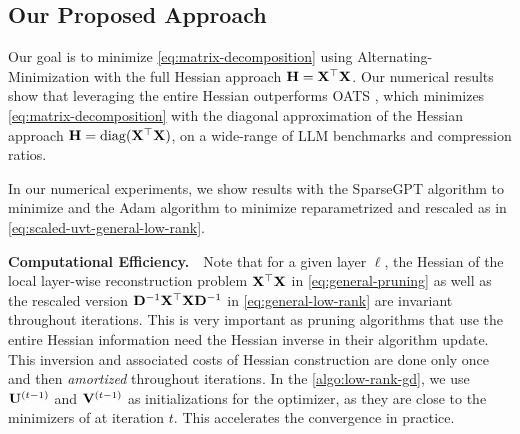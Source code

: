 \subsection{Our Proposed Approach}
\vspace{-5pt}
Our goal is to minimize \eqref{eq:matrix-decomposition} using Alternating-Minimization with the full Hessian approach $\mathbf{H} = \mathbf{X}^\top\mathbf{X}$. Our numerical results show that leveraging the entire Hessian outperforms OATS \cite{zhang2024oats}, which minimizes \eqref{eq:matrix-decomposition} with the diagonal approximation of the Hessian approach $\mathbf{H} = \operatorname{diag}({\mathbf{X}^\top\mathbf{X}})$, on a wide-range of LLM benchmarks and compression ratios. 

In our numerical experiments, we show results with the SparseGPT \cite{frantar2023sparsegpt} algorithm to minimize \Pone and the Adam algorithm \cite{kingma2014adam} to minimize \Ptwo reparametrized and rescaled as in \cref{eq:scaled-uvt-general-low-rank}. 

\textbf{Computational Efficiency.\,\,\,\,} Note that for a given layer $\ell$, the Hessian of the local layer-wise reconstruction problem $\mathbf{X}^\top\mathbf{X}$ in \eqref{eq:general-pruning} as well as the rescaled version $\mathbf{D}^{-1}\mathbf{X}^\top\mathbf{X}\mathbf{D}^{-1}$ in \eqref{eq:general-low-rank} are invariant throughout iterations. 
This is very important as pruning algorithms that use the entire Hessian information \cite{frantar2023sparsegpt, meng2024alps} need the Hessian inverse in their algorithm update. This inversion and associated costs of Hessian construction are done only once and then \textit{amortized} throughout iterations. In the \cref{algo:low-rank-gd}, we use $\mathbf{U}^{(t-1)}$ and $\mathbf{V}^{(t-1)}$ as initializations for the optimizer, as they are close to the minimizers of \Ptwo at iteration $t$. This accelerates the convergence in practice.


